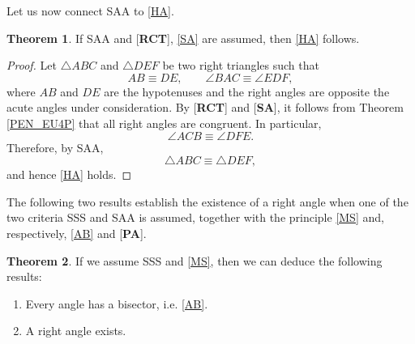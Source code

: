 \documentclass[11pt,a4paper]{article}
\theoremstyle{definition}
\newtheorem{thm}{Theorem}[section]
\theoremstyle{remark}
\numberwithin{equation}{section}
\begin{document}
Let us now connect SAA to \ref{HA}.
\begin{thm}\label{PEN_LAA_HA}
If SAA and [\textbf{RCT}], \ref{SA} are assumed, then \ref{HA} follows.
\end{thm}
\begin{proof}
Let $\triangle ABC$ and $\triangle DEF$ be two right triangles such that
\begin{equation*}
AB\equiv DE,\qquad \angle BAC\equiv\angle EDF,
\end{equation*}
where $AB$ and $DE$ are the hypotenuses and the right angles are opposite the acute angles under consideration. By [\textbf{RCT}] and [\textbf{SA}], it follows from Theorem \ref{PEN_EU4P} that all right angles are congruent. In particular,
\begin{equation*}
\angle ACB\equiv\angle DFE.
\end{equation*}
Therefore, by SAA,
\begin{equation*}
\triangle ABC\equiv\triangle DEF,
\end{equation*}
and hence \ref{HA} holds.
\end{proof}
The following two results establish the existence of a right angle when one of the two criteria SSS and SAA is assumed, together with the principle \ref{MS} and, respectively, \ref{AB} and [\textbf{PA}].
\begin{thm}\label{PEN_LLL_RAE} If we assume SSS and \ref{MS}, then we can deduce the following results:
\begin{enumerate}[label=(\roman*)]
  \item Every angle has a bisector, i.e. \ref{AB}.
  \item A right angle exists.
\end{enumerate}
\end{thm}
\end{document}
